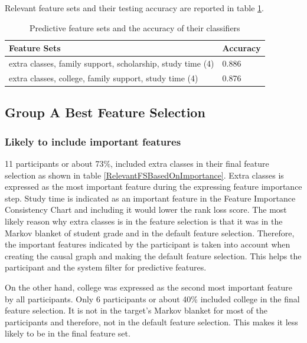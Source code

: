Relevant feature sets and their testing accuracy are reported in table \ref{relevantFS}.

\begin{table}[]
\centering
\begin{tabular}{ll}
\hline
Feature Sets                                               & Accuracy \\ \hline
extra classes, family support, scholarship, study time (4) & 0.886    \\
extra classes, college, family support, study time (4)     & 0.876    \\ \hline

\end{tabular}
\caption{Predictive feature sets and the accuracy of their classifiers}
\label{relevantFS}
\end{table}

\subsection { Group A Best Feature Selection }

\subsubsection { Likely to include important features }
11 participants or about 73\%, included extra classes in their final feature selection as shown in table \ref{RelevantFSBasedOnImportance}. Extra classes is expressed as the most important feature during the expressing feature importance step. Study time is indicated as an important feature in the Feature Importance Consistency Chart and including it would lower the rank loss score. The most likely reason why extra classes is in the feature selection is that it was in the Markov blanket of student grade and in the default feature selection. Therefore, the important features indicated by the participant is taken into account when creating the causal graph and making the default feature selection. This helps the participant and the system filter for predictive features.

On the other hand, college was expressed as the second most important feature by all participants. Only 6 participants or about 40\% included college in the final feature selection. It is not in the target's Markov blanket for most of the participants and therefore, not in the default feature selection. This makes it less likely to be in the final feature set.

